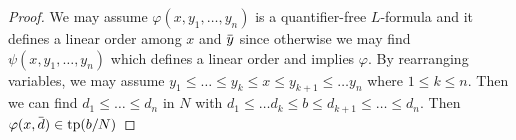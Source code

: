 \documentclass[11pt]{article}
\begin{document}
\begin{proof}
We may assume \(\varphi(x,y_1,\dots,y_n)\) is a quantifier-free \(L\)-formula and it defines a linear order
among \(x\) and \(\bary\) since otherwise we may find \(\psi(x,y_1,\dots,y_n)\) which defines a linear order
and implies \(\varphi\). By rearranging variables, we may assume \(y_1\le\dots\le y_k\le x\le y_{k+1}\le\dots y_n\)
where \(1\le k\le n\). Then we can find \(d_1\le\dots\le d_n\) in \(N\) with \(d_1\le\dots d_k\le b\le d_{k+1}\le\dots\le d_n\).
Then \(\varphi(x,\bard)\in\tp(b/N)\)
\end{proof}
\end{document}
